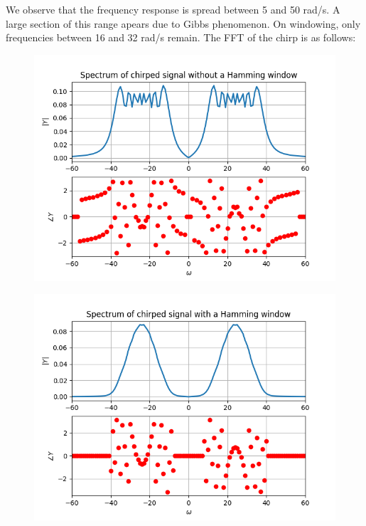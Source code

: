 \documentclass[12pt, a4paper]{article}
\begin{document}
We observe that the frequency response is spread between 5 and 50 rad/s.
A large section of this range apears due to Gibbs phenomenon.
On windowing, only frequencies between 16 and 32 rad/s remain.
The FFT of the chirp is as follows:
\begin{figure}[H]
    \centering
    \includegraphics[scale=0.7]{q5a.png}
\end{figure}
\begin{figure}[H]
    \centering
    \includegraphics[scale=0.7]{q5b.png}
\end{figure}
\end{document}
